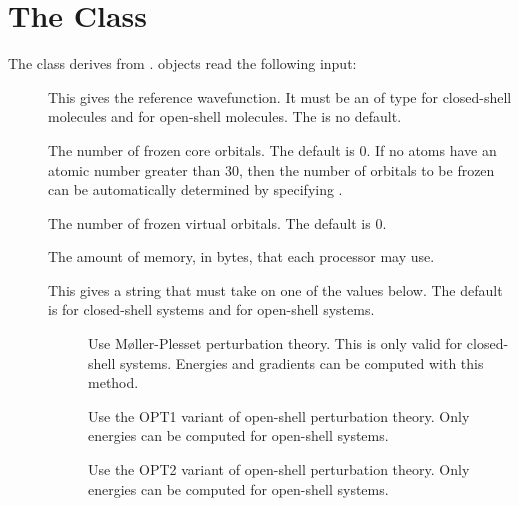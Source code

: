 

\section{The  Class}
\label{MBPT2}

The  class derives from .
 objects read the following input:

\begin{description}
  \item[] This gives the reference wavefunction.  It must
     be an  of type  for
     closed-shell molecules and  for open-shell
     molecules.  The is no default.

  \item[] The number of frozen core orbitals.  The default
     is 0.  If no atoms have an atomic number greater than 30, then
     the number of orbitals to be frozen can be automatically determined
     by specifying .

  \item[] The number of frozen virtual orbitals.  The default
     is 0.

  \item[] The amount of memory, in bytes, that each processor
     may use.

  \item[] This gives a string that must take on one of the
     values below.  The default is  for closed-shell systems
     and  for open-shell systems.

      \begin{description}

        \item[] Use M\o{}ller-Plesset perturbation theory.  This
           is only valid for closed-shell systems.  Energies and
           gradients can be computed with this method.

        \item[] Use the OPT1 variant of open-shell perturbation
           theory.  Only energies can be computed for open-shell systems.

        \item[] Use the OPT2 variant of open-shell perturbation
           theory.  Only energies can be computed for open-shell systems.


\end{description}
\end{description}
